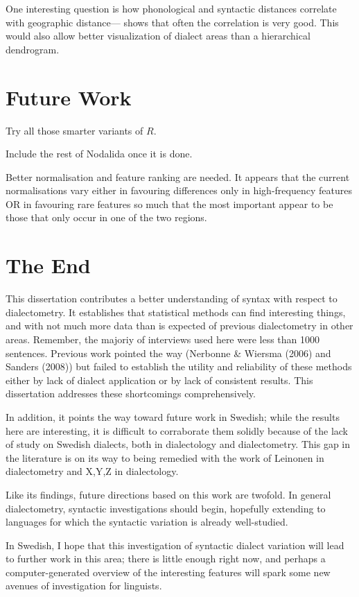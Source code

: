 One interesting question is
how phonological and syntactic distances correlate with geographic
distance--- shows that often the correlation is
very good. This would also allow better visualization of dialect areas
than a hierarchical dendrogram.

\section{Future Work}

Try all those smarter variants of $R$.

Include the rest of Nodalida once it is done.

Better normalisation and feature ranking are needed. It appears that
the current normalisations vary either in favouring differences
only in high-frequency features OR in favouring rare features so much
that the most important appear to be those that only occur in one of
the two regions.

\section{The End}

This dissertation contributes a better understanding of syntax with
respect to dialectometry. It establishes that statistical methods can
find interesting things, and with not much more data than is expected
of previous dialectometry in other areas. Remember, the majoriy of
interviews used here were less than 1000 sentences. Previous work
pointed the way (Nerbonne \& Wiersma (2006) and Sanders (2008)) but
failed to establish the utility and reliability of these methods
either by lack of dialect application or by lack of consistent
results. This dissertation addresses these shortcomings
comprehensively.

In addition, it points the way toward future work in Swedish; while
the results here are interesting, it is difficult to corraborate them
solidly because of the lack of study on Swedish dialects, both in
dialectology and dialectometry. This gap in the literature is on its
way to being remedied with the work of Leinonen in dialectometry and
X,Y,Z in dialectology.

Like its findings, future directions based on this work are
twofold. In general dialectometry, syntactic investigations should
begin, hopefully extending to languages for which the syntactic
variation is already well-studied.

In Swedish, I hope that this investigation of syntactic dialect
variation will lead to further work in this area; there is little
enough right now, and perhaps a computer-generated overview of the
interesting features will spark some new avenues of investigation for
linguists.


